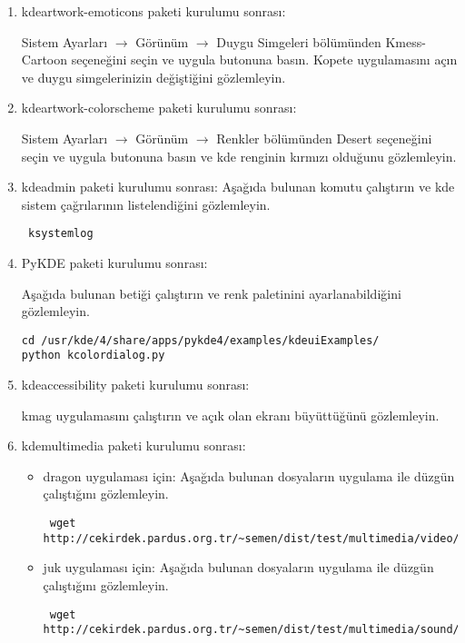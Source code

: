 \documentclass[a4paper,10pt]{article}
\begin{document}
\begin{enumerate}
\item kdeartwork-emoticons paketi kurulumu sonrası:

Sistem Ayarları $\rightarrow$ Görünüm $\rightarrow$ Duygu Simgeleri bölümünden Kmess-Cartoon seçeneğini seçin ve uygula butonuna basın. Kopete uygulamasını açın ve duygu simgelerinizin değiştiğini gözlemleyin.

\item kdeartwork-colorscheme paketi kurulumu sonrası:

Sistem Ayarları $\rightarrow$ Görünüm $\rightarrow$ Renkler bölümünden Desert seçeneğini seçin ve uygula butonuna basın ve kde renginin kırmızı olduğunu gözlemleyin.

\item kdeadmin paketi kurulumu sonrası:
Aşağıda bulunan komutu çalıştırın ve kde sistem çağrılarının listelendiğini gözlemleyin.
\begin{verbatim}
 ksystemlog
\end{verbatim}

\item PyKDE paketi kurulumu sonrası:

Aşağıda bulunan betiği çalıştırın ve renk paletinini ayarlanabildiğini gözlemleyin.
\begin{verbatim}
cd /usr/kde/4/share/apps/pykde4/examples/kdeuiExamples/
python kcolordialog.py
\end{verbatim}

\item kdeaccessibility paketi kurulumu sonrası:

kmag uygulamasını çalıştırın ve açık olan ekranı büyüttüğünü gözlemleyin.

\item kdemultimedia paketi kurulumu sonrası:
\begin{itemize}
 \item dragon uygulaması için:
Aşağıda bulunan dosyaların uygulama ile düzgün çalıştığını gözlemleyin.
\begin{verbatim}
 wget http://cekirdek.pardus.org.tr/~semen/dist/test/multimedia/video/cokluortam.tar
\end{verbatim}

\item juk uygulaması için:
Aşağıda bulunan dosyaların uygulama ile düzgün çalıştığını gözlemleyin.
\begin{verbatim}
 wget http://cekirdek.pardus.org.tr/~semen/dist/test/multimedia/sound/sound.tar
\end{verbatim}


\end{itemize}
\end{enumerate}
\end{document}
